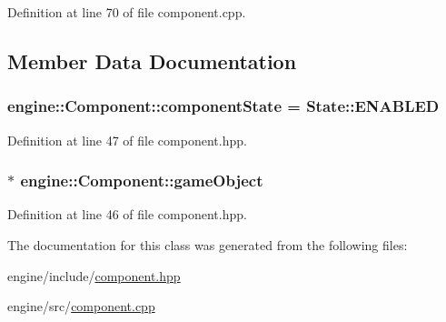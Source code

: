 Definition at line 70 of file component.\+cpp.



\subsection{Member Data Documentation}
\subsubsection[{\texorpdfstring{component\+State}{componentState}}]{ engine\+::\+Component\+::component\+State = State\+::\+E\+N\+A\+B\+L\+ED\hspace{0.3cm}{\ttfamily [protected]}}\hypertarget{classengine_1_1_component_acd64e7e69db92dbdafe70d208dc1c85e}{}\label{classengine_1_1_component_acd64e7e69db92dbdafe70d208dc1c85e}


Definition at line 47 of file component.\+hpp.

\subsubsection[{\texorpdfstring{game\+Object}{gameObject}}]{$\ast$ engine\+::\+Component\+::game\+Object\hspace{0.3cm}{\ttfamily [protected]}}\hypertarget{classengine_1_1_component_ad4a4865ca4df98ebea34d04a4ec5ad07}{}\label{classengine_1_1_component_ad4a4865ca4df98ebea34d04a4ec5ad07}


Definition at line 46 of file component.\+hpp.



The documentation for this class was generated from the following files\+:\begin{DoxyCompactItemize}
\item 
engine/include/\hyperlink{component_8hpp}{component.\+hpp}\item 
engine/src/\hyperlink{component_8cpp}{component.\+cpp}\end{DoxyCompactItemize}
